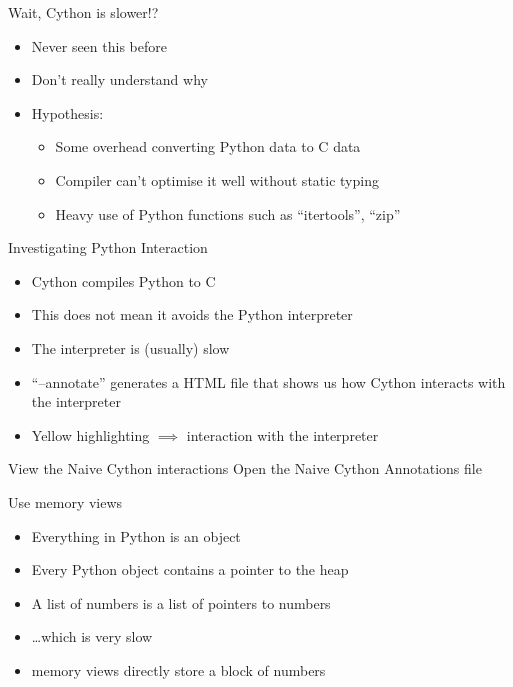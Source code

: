 \documentclass[12pt,xcolor=dvipsnames]{beamer}
\begin{document}
    \begin{frame}{Wait, Cython is slower!?}
        \begin{itemize}
            \item Never seen this before
            \item Don’t really understand why
            \item Hypothesis:
            \begin{itemize}
                \item Some overhead converting Python data to C data
                \item Compiler can’t optimise it well without static typing
                \item Heavy use of Python functions such as ``itertools'', ``zip''
            \end{itemize}
        \end{itemize}
    \end{frame}

    \begin{frame}{Investigating Python Interaction}
        \begin{itemize}
            \item Cython compiles Python to C
            \item This does not mean it avoids the Python interpreter
            \item The interpreter is (usually) slow
            \item ``--annotate'' generates a HTML file that shows us how Cython interacts with the interpreter
            \item Yellow highlighting $\implies$ interaction with the interpreter
        \end{itemize}
    \end{frame}

    \begin{frame}{View the Naive Cython interactions}
        Open the Naive Cython Annotations file
    \end{frame}

    \begin{frame}{Use memory views}
        \begin{itemize}
            \item Everything in Python is an object
            \item Every Python object contains a pointer to the heap
            \item A list of numbers is a list of pointers to numbers
            \item \ldots which is very slow
            \item memory views directly store a block of numbers
        \end{itemize}
    \end{frame}
\end{document}
